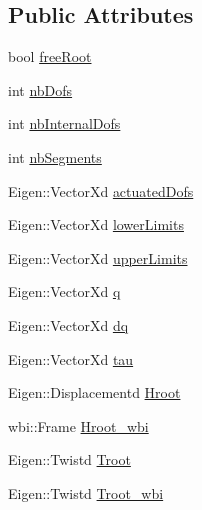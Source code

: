 \subsection*{\-Public \-Attributes}
\begin{DoxyCompactItemize}
\item 
bool \hyperlink{structOcraWbiModel_1_1OcraWbiModel__pimpl_ac779ed6d908a6e1773ce4be340bd8182}{free\-Root}
\item 
int \hyperlink{structOcraWbiModel_1_1OcraWbiModel__pimpl_a311221586ff8ca7d778b3c51129f8dd2}{nb\-Dofs}
\item 
int \hyperlink{structOcraWbiModel_1_1OcraWbiModel__pimpl_aa90eceb0093c8efcdb63be8712c3855c}{nb\-Internal\-Dofs}
\item 
int \hyperlink{structOcraWbiModel_1_1OcraWbiModel__pimpl_aae0928d1a4394598af740ab151e0d7db}{nb\-Segments}
\item 
\-Eigen\-::\-Vector\-Xd \hyperlink{structOcraWbiModel_1_1OcraWbiModel__pimpl_aca1e7991e3aa3941dfb08b58b4f8e82c}{actuated\-Dofs}
\item 
\-Eigen\-::\-Vector\-Xd \hyperlink{structOcraWbiModel_1_1OcraWbiModel__pimpl_aafa8af9a88392dbb874459894cbf181a}{lower\-Limits}
\item 
\-Eigen\-::\-Vector\-Xd \hyperlink{structOcraWbiModel_1_1OcraWbiModel__pimpl_a632b9a37d054a1dc6fcf6403e52e62e7}{upper\-Limits}
\item 
\-Eigen\-::\-Vector\-Xd \hyperlink{structOcraWbiModel_1_1OcraWbiModel__pimpl_a1f83373b2d975e1882ee7812215df997}{q}
\item 
\-Eigen\-::\-Vector\-Xd \hyperlink{structOcraWbiModel_1_1OcraWbiModel__pimpl_a6584a086fe050dab90cd4f0a0e7e970d}{dq}
\item 
\-Eigen\-::\-Vector\-Xd \hyperlink{structOcraWbiModel_1_1OcraWbiModel__pimpl_a3dc9c0b3d43f7406a6b89bd2a2af5642}{tau}
\item 
\-Eigen\-::\-Displacementd \hyperlink{structOcraWbiModel_1_1OcraWbiModel__pimpl_a123381dc5b78bd79aed493801e3e6b35}{\-Hroot}
\item 
wbi\-::\-Frame \hyperlink{structOcraWbiModel_1_1OcraWbiModel__pimpl_a633b61e128305d5437d8e8c61ae63849}{\-Hroot\-\_\-wbi}
\item 
\-Eigen\-::\-Twistd \hyperlink{structOcraWbiModel_1_1OcraWbiModel__pimpl_a7028a65d7121f197364f3e5265387771}{\-Troot}
\item 
\-Eigen\-::\-Twistd \hyperlink{structOcraWbiModel_1_1OcraWbiModel__pimpl_acd5e52a21301d36f453dd9a43fc6f50b}{\-Troot\-\_\-wbi}
\item 

\end{DoxyCompactItemize}
